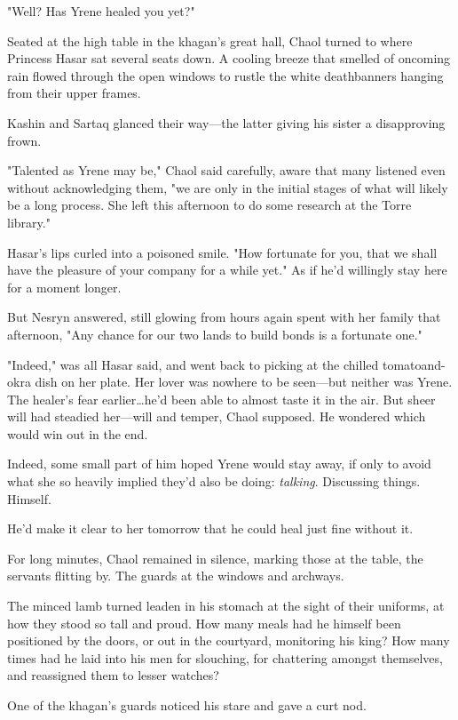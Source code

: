 "Well?
Has Yrene healed you yet?"

Seated at the high table in the khagan's great hall, Chaol turned to where Princess Hasar sat several seats down.
A cooling breeze that smelled of oncoming rain flowed through the open windows to rustle the white deathbanners hanging from their upper frames.

Kashin and Sartaq glanced their way---the latter giving his sister a disapproving frown.

"Talented as Yrene may be," Chaol said carefully, aware that many listened even without acknowledging them, "we are only in the initial stages of what will likely be a long process.
She left this afternoon to do some research at the Torre library."

Hasar's lips curled into a poisoned smile.
"How fortunate for you, that we shall have the pleasure of your company for a while yet."
As if he'd willingly stay here for a moment longer.

But Nesryn answered, still glowing from hours again spent with her family that afternoon, "Any chance for our two lands to build bonds is a fortunate one."

"Indeed," was all Hasar said, and went back to picking at the chilled tomatoand-okra dish on her plate.
Her lover was nowhere to be seen---but neither was Yrene.
The healer's fear earlier\ldots he'd been able to almost taste it in the air.
But sheer will had steadied her---will and temper, Chaol supposed.
He wondered which would win out in the end.

Indeed, some small part of him hoped Yrene would stay away, if only to avoid what she so heavily implied they'd also be doing: \emph{talking}.
Discussing things.
Himself.

He'd make it clear to her tomorrow that he could heal just fine without it.

For long minutes, Chaol remained in silence, marking those at the table, the servants flitting by.
The guards at the windows and archways.

The minced lamb turned leaden in his stomach at the sight of their uniforms, at how they stood so tall and proud.
How many meals had he himself been positioned by the doors, or out in the courtyard, monitoring his king?
How many times had he laid into his men for slouching, for chattering amongst themselves, and reassigned them to lesser watches?

One of the khagan's guards noticed his stare and gave a curt nod.

